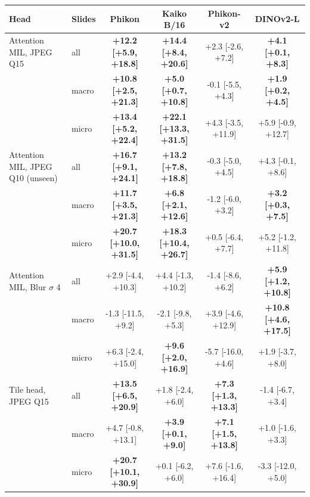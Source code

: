 \begin{tabular}{@{}llcccc@{}}
\toprule
Head & Slides & Phikon & Kaiko B/16 & Phikon-v2 & DINOv2-L\\
\midrule
Attention MIL, JPEG Q15 & all & \textbf{+12.2 {\scriptsize[+5.9, +18.8]}} & \textbf{+14.4 {\scriptsize[+8.4, +20.6]}} & +2.3 {\scriptsize[-2.6, +7.2]} & \textbf{+4.1 {\scriptsize[+0.1, +8.3]}}\\
 & macro & \textbf{+10.8 {\scriptsize[+2.5, +21.3]}} & \textbf{+5.0 {\scriptsize[+0.7, +10.8]}} & -0.1 {\scriptsize[-5.5, +4.3]} & \textbf{+1.9 {\scriptsize[+0.2, +4.5]}}\\
 & micro & \textbf{+13.4 {\scriptsize[+5.2, +22.4]}} & \textbf{+22.1 {\scriptsize[+13.3, +31.5]}} & +4.3 {\scriptsize[-3.5, +11.9]} & +5.9 {\scriptsize[-0.9, +12.7]}\\
\addlinespace
Attention MIL, JPEG Q10 (unseen) & all & \textbf{+16.7 {\scriptsize[+9.1, +24.1]}} & \textbf{+13.2 {\scriptsize[+7.8, +18.8]}} & -0.3 {\scriptsize[-5.0, +4.5]} & +4.3 {\scriptsize[-0.1, +8.6]}\\
 & macro & \textbf{+11.7 {\scriptsize[+3.5, +21.3]}} & \textbf{+6.8 {\scriptsize[+2.1, +12.6]}} & -1.2 {\scriptsize[-6.0, +3.2]} & \textbf{+3.2 {\scriptsize[+0.3, +7.5]}}\\
 & micro & \textbf{+20.7 {\scriptsize[+10.0, +31.5]}} & \textbf{+18.3 {\scriptsize[+10.4, +26.7]}} & +0.5 {\scriptsize[-6.4, +7.7]} & +5.2 {\scriptsize[-1.2, +11.8]}\\
\addlinespace
Attention MIL, Blur $\sigma$ 4 & all & +2.9 {\scriptsize[-4.4, +10.3]} & +4.4 {\scriptsize[-1.3, +10.2]} & -1.4 {\scriptsize[-8.6, +6.2]} & \textbf{+5.9 {\scriptsize[+1.2, +10.8]}}\\
 & macro & -1.3 {\scriptsize[-11.5, +9.2]} & -2.1 {\scriptsize[-9.8, +5.3]} & +3.9 {\scriptsize[-4.6, +12.9]} & \textbf{+10.8 {\scriptsize[+4.6, +17.5]}}\\
 & micro & +6.3 {\scriptsize[-2.4, +15.0]} & \textbf{+9.6 {\scriptsize[+2.0, +16.9]}} & -5.7 {\scriptsize[-16.0, +4.6]} & +1.9 {\scriptsize[-3.7, +8.0]}\\
\addlinespace
Tile head, JPEG Q15 & all & \textbf{+13.5 {\scriptsize[+6.5, +20.9]}} & +1.8 {\scriptsize[-2.4, +6.0]} & \textbf{+7.3 {\scriptsize[+1.3, +13.3]}} & -1.4 {\scriptsize[-6.7, +3.4]}\\
 & macro & +4.7 {\scriptsize[-0.8, +13.1]} & \textbf{+3.9 {\scriptsize[+0.1, +9.0]}} & \textbf{+7.1 {\scriptsize[+1.5, +13.8]}} & +1.0 {\scriptsize[-1.6, +3.3]}\\
 & micro & \textbf{+20.7 {\scriptsize[+10.1, +30.9]}} & +0.1 {\scriptsize[-6.2, +6.0]} & +7.6 {\scriptsize[-1.6, +16.4]} & -3.3 {\scriptsize[-12.0, +5.0]}\\

\end{tabular}
